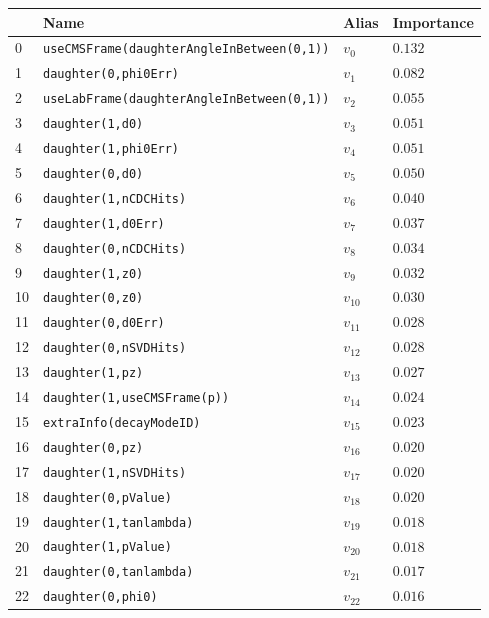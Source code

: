 \begin{longtable}{| p{} | p{} | p{} |p{} |}
\hline
& Name & Alias & Importance \\ \hline
0 &\texttt{useCMSFrame(daughterAngleInBetween(0,1))} & $v_{0}$ & $0.132$ \\ \hline
1 &\texttt{daughter(0,phi0Err)} & $v_{1}$ & $0.082$ \\ \hline
2 &\texttt{useLabFrame(daughterAngleInBetween(0,1))} & $v_{2}$ & $0.055$ \\ \hline
3 &\texttt{daughter(1,d0)} & $v_{3}$ & $0.051$ \\ \hline
4 &\texttt{daughter(1,phi0Err)} & $v_{4}$ & $0.051$ \\ \hline
5 &\texttt{daughter(0,d0)} & $v_{5}$ & $0.050$ \\ \hline
6 &\texttt{daughter(1,nCDCHits)} & $v_{6}$ & $0.040$ \\ \hline
7 &\texttt{daughter(1,d0Err)} & $v_{7}$ & $0.037$ \\ \hline
8 &\texttt{daughter(0,nCDCHits)} & $v_{8}$ & $0.034$ \\ \hline
9 &\texttt{daughter(1,z0)} & $v_{9}$ & $0.032$ \\ \hline
10 &\texttt{daughter(0,z0)} & $v_{10}$ & $0.030$ \\ \hline
11 &\texttt{daughter(0,d0Err)} & $v_{11}$ & $0.028$ \\ \hline
12 &\texttt{daughter(0,nSVDHits)} & $v_{12}$ & $0.028$ \\ \hline
13 &\texttt{daughter(1,pz)} & $v_{13}$ & $0.027$ \\ \hline
14 &\texttt{daughter(1,useCMSFrame(p))} & $v_{14}$ & $0.024$ \\ \hline
15 &\texttt{extraInfo(decayModeID)} & $v_{15}$ & $0.023$ \\ \hline
16 &\texttt{daughter(0,pz)} & $v_{16}$ & $0.020$ \\ \hline
17 &\texttt{daughter(1,nSVDHits)} & $v_{17}$ & $0.020$ \\ \hline
18 &\texttt{daughter(0,pValue)} & $v_{18}$ & $0.020$ \\ \hline
19 &\texttt{daughter(1,tanlambda)} & $v_{19}$ & $0.018$ \\ \hline
20 &\texttt{daughter(1,pValue)} & $v_{20}$ & $0.018$ \\ \hline
21 &\texttt{daughter(0,tanlambda)} & $v_{21}$ & $0.017$ \\ \hline
22 &\texttt{daughter(0,phi0)} & $v_{22}$ & $0.016$ \\ \hline

\end{longtable}
